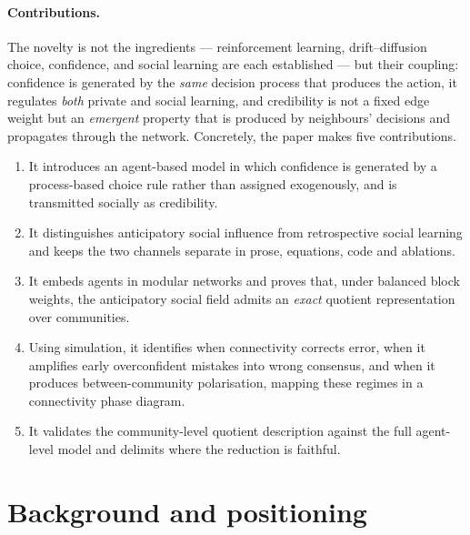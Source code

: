 \documentclass[11pt]{article}
\newcommand{\1}{\mathbf{1}}
\begin{document}
\paragraph{Contributions.}
The novelty is not the ingredients --- reinforcement learning, drift--diffusion
choice, confidence, and social learning are each established --- but their
coupling: confidence is generated by the \emph{same} decision process that
produces the action, it regulates \emph{both} private and social learning, and
credibility is not a fixed edge weight but an \emph{emergent} property that is
produced by neighbours' decisions and propagates through the network. Concretely,
the paper makes five contributions.
\begin{enumerate}[label=(\roman*),leftmargin=2.4em,itemsep=1pt]
\item It introduces an agent-based model in which confidence is generated by a
process-based choice rule rather than assigned exogenously, and is transmitted
socially as credibility.
\item It distinguishes anticipatory social influence from retrospective social
learning and keeps the two channels separate in prose, equations, code and
ablations.
\item It embeds agents in modular networks and proves that, under balanced
block weights, the anticipatory social field admits an \emph{exact} quotient
representation over communities.
\item Using simulation, it identifies when connectivity corrects error, when it
amplifies early overconfident mistakes into wrong consensus, and when it
produces between-community polarisation, mapping these regimes in a
connectivity phase diagram.
\item It validates the community-level quotient description against the full
agent-level model and delimits where the reduction is faithful.
\end{enumerate}

\section{Background and positioning}
\label{sec:background}
\end{document}
